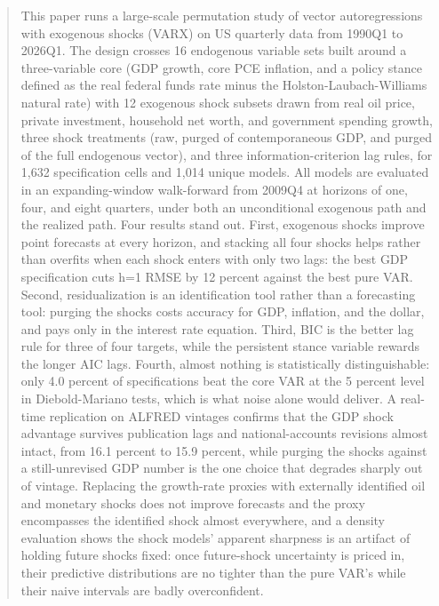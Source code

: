 \documentclass[conference]{IEEEtran}
\begin{document}
\begin{abstract}
This paper runs a large-scale permutation study of vector autoregressions with exogenous shocks (VARX) on US quarterly data from 1990Q1 to 2026Q1. The design crosses 16 endogenous variable sets built around a three-variable core (GDP growth, core PCE inflation, and a policy stance defined as the real federal funds rate minus the Holston-Laubach-Williams natural rate) with 12 exogenous shock subsets drawn from real oil price, private investment, household net worth, and government spending growth, three shock treatments (raw, purged of contemporaneous GDP, and purged of the full endogenous vector), and three information-criterion lag rules, for 1{,}632 specification cells and 1{,}014 unique models. All models are evaluated in an expanding-window walk-forward from 2009Q4 at horizons of one, four, and eight quarters, under both an unconditional exogenous path and the realized path. Four results stand out. First, exogenous shocks improve point forecasts at every horizon, and stacking all four shocks helps rather than overfits when each shock enters with only two lags: the best GDP specification cuts h=1 RMSE by 12 percent against the best pure VAR. Second, residualization is an identification tool rather than a forecasting tool: purging the shocks costs accuracy for GDP, inflation, and the dollar, and pays only in the interest rate equation. Third, BIC is the better lag rule for three of four targets, while the persistent stance variable rewards the longer AIC lags. Fourth, almost nothing is statistically distinguishable: only 4.0 percent of specifications beat the core VAR at the 5 percent level in Diebold-Mariano tests, which is what noise alone would deliver. A real-time replication on ALFRED vintages confirms that the GDP shock advantage survives publication lags and national-accounts revisions almost intact, from 16.1 percent to 15.9 percent, while purging the shocks against a still-unrevised GDP number is the one choice that degrades sharply out of vintage. Replacing the growth-rate proxies with externally identified oil and monetary shocks does not improve forecasts and the proxy encompasses the identified shock almost everywhere, and a density evaluation shows the shock models' apparent sharpness is an artifact of holding future shocks fixed: once future-shock uncertainty is priced in, their predictive distributions are no tighter than the pure VAR's while their naive intervals are badly overconfident.
\end{abstract}
\end{document}
